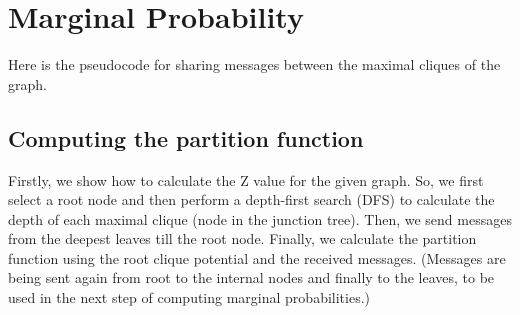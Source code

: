 \documentclass[a4paper,12pt]{article}
\begin{document}
\section{Marginal Probability}
Here is the pseudocode for sharing messages between the maximal cliques of the graph.

\subsection*{Computing the partition function}  
Firstly, we show how to calculate the Z value for the given graph. So, we first select a root node and then perform a depth-first search (DFS) to calculate the depth of each maximal clique (node in the junction tree). Then, we send messages from the deepest leaves till the root node. Finally, we calculate the partition function using the root clique potential and the received messages. (Messages are being sent again from root to the internal nodes and finally to the leaves, to be used in the next step of computing marginal probabilities.)    
\end{document}
